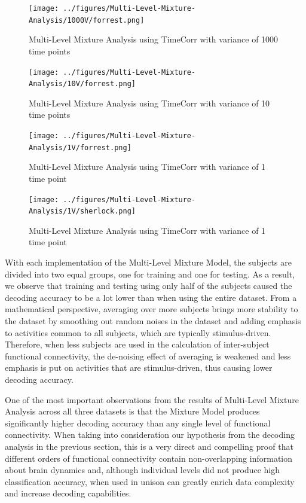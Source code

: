 \documentclass[11pt]{article}
\begin{document}
\begin{figure}[!htb]
\caption{Multi-Level Mixture Analysis using TimeCorr with variance of 1000 time points}
\centering
\texttt{[image: ../figures/Multi-Level-Mixture-Analysis/1000V/forrest.png]}
\label{fig:forrestMM1000}
\end{figure}

\begin{figure}[!htb]
\caption{Multi-Level Mixture Analysis using TimeCorr with variance of 10 time points}
\centering
\texttt{[image: ../figures/Multi-Level-Mixture-Analysis/10V/forrest.png]}
\label{fig:forrestMM10}
\end{figure}

\begin{figure}[!htb]
\caption{Multi-Level Mixture Analysis using TimeCorr with variance of 1 time point}
\centering
\texttt{[image: ../figures/Multi-Level-Mixture-Analysis/1V/forrest.png]}
\label{fig:forrestMM1}
\end{figure}

\begin{figure}[!htb]
\caption{Multi-Level Mixture Analysis using TimeCorr with variance of 1 time point}
\centering
\texttt{[image: ../figures/Multi-Level-Mixture-Analysis/1V/sherlock.png]}
\label{fig:sherlockMM1}
\end{figure}

With each implementation of the Multi-Level Mixture Model, the subjects are divided into two equal groups, one for training and one for testing. As a result, we observe that training and testing using only half of the subjects caused the decoding accuracy to be a lot lower than when using the entire dataset. From a mathematical perspective, averaging over more subjects brings more stability to the dataset by smoothing out random noises in the dataset and adding emphasis to activities common to all subjects, which are typically stimulus-driven. Therefore, when less subjects are used in the calculation of inter-subject functional connectivity, the de-noising effect of averaging is weakened and less emphasis is put on activities that are stimulus-driven, thus causing lower decoding accuracy.

One of the most important observations from the results of Multi-Level Mixture Analysis across all three datasets is that the Mixture Model produces significantly higher decoding accuracy than any single level of functional connectivity. When taking into consideration our hypothesis from the decoding analysis in the previous section, this is a very direct and compelling proof that different orders of functional connectivity contain non-overlapping information about brain dynamics and, although individual levels did not produce high classification accuracy, when used in unison can greatly enrich data complexity and increase decoding capabilities.
\end{document}
